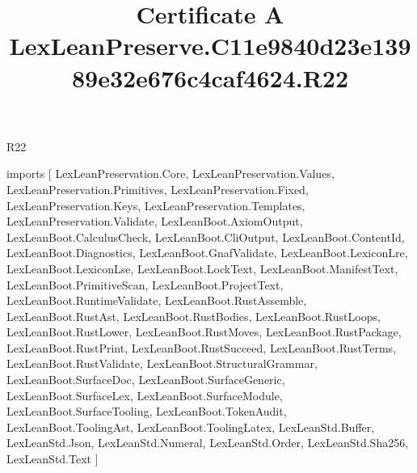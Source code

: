 \begin{lexlean}{R22}
\title{Certificate A LexLeanPreserve.C11e9840d23e13989e32e676c4caf4624.R22}
\begin{coremodule}
imports [
  LexLeanPreservation.Core,
  LexLeanPreservation.Values,
  LexLeanPreservation.Primitives,
  LexLeanPreservation.Fixed,
  LexLeanPreservation.Keys,
  LexLeanPreservation.Templates,
  LexLeanPreservation.Validate,
  LexLeanBoot.AxiomOutput,
  LexLeanBoot.CalculusCheck,
  LexLeanBoot.CliOutput,
  LexLeanBoot.ContentId,
  LexLeanBoot.Diagnostics,
  LexLeanBoot.GnafValidate,
  LexLeanBoot.LexiconLre,
  LexLeanBoot.LexiconLse,
  LexLeanBoot.LockText,
  LexLeanBoot.ManifestText,
  LexLeanBoot.PrimitiveScan,
  LexLeanBoot.ProjectText,
  LexLeanBoot.RuntimeValidate,
  LexLeanBoot.RustAssemble,
  LexLeanBoot.RustAst,
  LexLeanBoot.RustBodies,
  LexLeanBoot.RustLoops,
  LexLeanBoot.RustLower,
  LexLeanBoot.RustMoves,
  LexLeanBoot.RustPackage,
  LexLeanBoot.RustPrint,
  LexLeanBoot.RustSucceed,
  LexLeanBoot.RustTerms,
  LexLeanBoot.RustValidate,
  LexLeanBoot.StructuralGrammar,
  LexLeanBoot.SurfaceDoc,
  LexLeanBoot.SurfaceGeneric,
  LexLeanBoot.SurfaceLex,
  LexLeanBoot.SurfaceModule,
  LexLeanBoot.SurfaceTooling,
  LexLeanBoot.TokenAudit,
  LexLeanBoot.ToolingAst,
  LexLeanBoot.ToolingLatex,
  LexLeanStd.Buffer,
  LexLeanStd.Json,
  LexLeanStd.Numeral,
  LexLeanStd.Order,
  LexLeanStd.Sha256,
  LexLeanStd.Text
]


\end{coremodule}
\end{lexlean}

